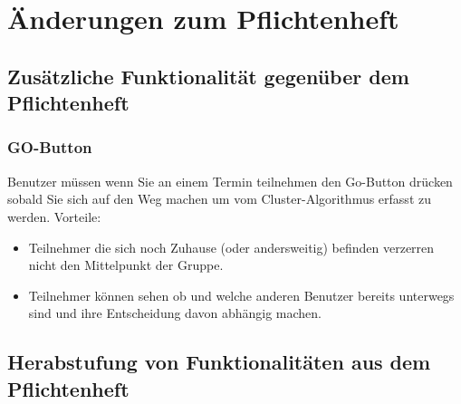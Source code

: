 \section{Änderungen zum Pflichtenheft}
	\subsection{Zusätzliche Funktionalität gegenüber dem Pflichtenheft}
	\subsubsection{GO-Button}
		Benutzer müssen wenn Sie an einem Termin teilnehmen den Go-Button drücken sobald Sie sich auf den Weg machen um vom Cluster-Algorithmus erfasst zu werden. 
		\newline
		Vorteile:
		\begin{itemize}
		\item Teilnehmer die sich noch Zuhause (oder andersweitig) befinden verzerren nicht den Mittelpunkt der Gruppe.
		\item Teilnehmer können sehen ob und welche anderen Benutzer bereits unterwegs sind und ihre Entscheidung davon abhängig machen.
		\end{itemize}
	\subsection{Herabstufung von Funktionalitäten aus dem Pflichtenheft}
